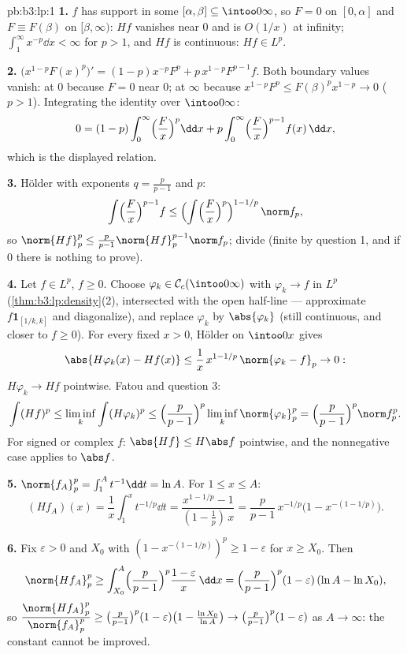 \begin{solution}{pb:b3:lp:1}
\textbf{1.} $f$ has support in some $[\alpha, \beta]
\subseteq \intoo0\infty$, so $F = 0$ on $[0, \alpha]$ and $F
\equiv F(\beta)$ on $[\beta, \infty)$: $Hf$ vanishes near $0$
and is $O(1/x)$ at infinity; $\int_1^\infty x^{-p}\dd x <
\infty$ for $p > 1$, and $Hf$ is continuous: $Hf \in L^p$.

\textbf{2.} $\bigl(x^{1-p}F(x)^p\bigr)' = (1-p)x^{-p}F^p +
p\,x^{1-p}F^{p-1}f$. Both boundary values vanish: at $0$
because $F = 0$ near $0$; at $\infty$ because $x^{1-p}F^p \leq
F(\beta)^p x^{1-p} \to 0$ ($p > 1$). Integrating the identity
over $\intoo0\infty$:
\[
0 = (1 - p)\int_0^\infty\Bigl(\frac Fx\Bigr)^p\dd x
+ p\int_0^\infty\Bigl(\frac Fx\Bigr)^{p-1}f(x)\,\dd x,
\]
which is the displayed relation.

\textbf{3.} H\"older with exponents $q = \frac p{p-1}$ and $p$:
\[
\int\Bigl(\frac Fx\Bigr)^{p-1}f
\leq \Bigl(\int\Bigl(\frac
Fx\Bigr)^{p}\Bigr)^{1 - 1/p}\,\norm f_p ,
\]
so $\norm{Hf}_p^p \leq \frac p{p-1}\norm{Hf}_p^{p-1}\norm
f_p$; divide (finite by question 1, and if $0$ there is
nothing to prove).

\textbf{4.} Let $f \in L^p$, $f \geq 0$. Choose $\varphi_k \in
\mathcal C_c(\intoo0\infty)$ with $\varphi_k \to f$ in $L^p$
(\cref{thm:b3:lp:density}(2), intersected with the open
half-line --- approximate $f\mathbf 1_{[1/k, k]}$ and
diagonalize), and replace $\varphi_k$ by $\abs{\varphi_k}$
(still continuous, and closer to $f \geq 0$). For every fixed
$x > 0$, H\"older on $\intoo0x$ gives
\[
\abs{H\varphi_k(x) - Hf(x)} \leq
\frac1x\,x^{1 - 1/p}\,\norm{\varphi_k - f}_p \to 0 :
\]
$H\varphi_k \to Hf$ pointwise. Fatou and question 3:
\[
\int (Hf)^p \leq \liminf_k\int(H\varphi_k)^p
\leq \Bigl(\frac p{p-1}\Bigr)^p\liminf_k\norm{\varphi_k}_p^p
= \Bigl(\frac p{p-1}\Bigr)^p\norm f_p^p .
\]
For signed or complex $f$: $\abs{Hf} \leq H\abs f$ pointwise,
and the nonnegative case applies to $\abs f$.

\textbf{5.} $\norm{f_A}_p^p = \int_1^A t^{-1}\dd t = \ln A$.
For $1 \leq x \leq A$:
\[
(Hf_A)(x) = \frac1x\int_1^x t^{-1/p}\dd t
= \frac{x^{1 - 1/p} - 1}{(1 - \tfrac1p)\,x}
= \frac p{p-1}\,x^{-1/p}\bigl(1 - x^{-(1 - 1/p)}\bigr).
\]

\textbf{6.} Fix $\varepsilon > 0$ and $X_0$ with $(1 -
x^{-(1-1/p)})^p \geq 1 - \varepsilon$ for $x \geq X_0$. Then
\[
\norm{Hf_A}_p^p \geq \int_{X_0}^A\Bigl(\frac
p{p-1}\Bigr)^p\frac{1 - \varepsilon}{x}\,\dd x
= \Bigl(\frac p{p-1}\Bigr)^p(1 - \varepsilon)\,(\ln A - \ln
X_0),
\]
so $\dfrac{\norm{Hf_A}_p^p}{\norm{f_A}_p^p} \geq \bigl(\frac
p{p-1}\bigr)^p(1 - \varepsilon)\bigl(1 - \frac{\ln X_0}{\ln
A}\bigr) \to \bigl(\frac p{p-1}\bigr)^p(1 - \varepsilon)$ as
$A \to \infty$: the constant cannot be improved.


\end{solution}
